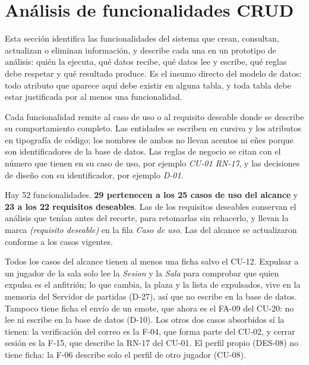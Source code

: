 \section*{Análisis de funcionalidades CRUD}

Esta sección identifica las funcionalidades del sistema que crean, consultan, actualizan o eliminan información, y describe cada una en un prototipo de análisis: quién la ejecuta, qué datos recibe, qué datos lee y escribe, qué reglas debe respetar y qué resultado produce. Es el insumo directo del modelo de datos: todo atributo que aparece aquí debe existir en alguna tabla, y toda tabla debe estar justificada por al menos una funcionalidad.

Cada funcionalidad remite al caso de uso o al requisito deseable donde se describe su comportamiento completo. Las entidades se escriben en cursiva y los atributos en tipografía de código; los nombres de ambos no llevan acentos ni eñes porque son identificadores de la base de datos. Las reglas de negocio se citan con el número que tienen en su caso de uso, por ejemplo \textit{\mbox{CU-01} \mbox{RN-17}}, y las decisiones de diseño con su identificador, por ejemplo \textit{\mbox{D-01}}.

Hay 52 funcionalidades. \textbf{29 pertenecen a los 25 casos de uso del alcance} y \textbf{23 a los 22 requisitos deseables}. Las de los requisitos deseables conservan el análisis que tenían antes del recorte, para retomarlas sin rehacerlo, y llevan la marca \textit{(requisito deseable)} en la fila \textit{Caso de uso}. Las del alcance se actualizaron conforme a los casos vigentes.

Todos los casos del alcance tienen al menos una ficha salvo el \mbox{CU-12}. Expulsar a un jugador de la sala solo lee la \textit{Sesion} y la \textit{Sala} para comprobar que quien expulsa es el anfitrión; lo que cambia, la plaza y la lista de expulsados, vive en la memoria del Servidor de partidas (\mbox{D-27}), así que no escribe en la base de datos. Tampoco tiene ficha el envío de un emote, que ahora es el \mbox{FA-09} del \mbox{CU-20}: no lee ni escribe en la base de datos (\mbox{D-10}). Los otros dos casos absorbidos sí la tienen: la verificación del correo es la \mbox{F-04}, que forma parte del \mbox{CU-02}, y cerrar sesión es la \mbox{F-15}, que describe la \mbox{RN-17} del \mbox{CU-01}. El perfil propio (\mbox{DES-08}) no tiene ficha: la \mbox{F-06} describe solo el perfil de otro jugador (\mbox{CU-08}).

